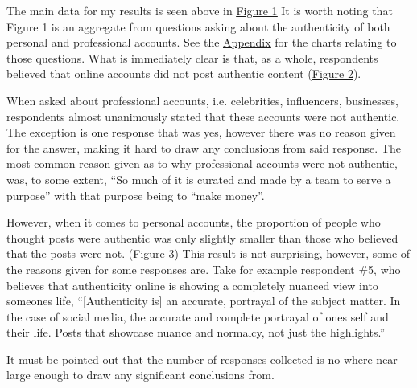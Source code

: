 \documentclass[12pt]{article}
\begin{document}
\begin{doublespace}
    \par The main data for my results is seen above in \underline{\hyperref[fig:pie1]{Figure 1}}
        It is worth noting that Figure 1 is an aggregate from questions asking about the authenticity of both personal and professional accounts. See the \underline{\hyperref[sec:appendix]{Appendix}} for the charts relating to those questions.
        What is immediately clear is that, as a whole, respondents believed that online accounts did not post authentic content (\underline{\hyperref[fig:chart2]{Figure 2}}).
    \par When asked about professional accounts, i.e. celebrities, influencers, businesses, respondents almost unanimously stated that these accounts were not authentic. 
        The exception is one response that was yes, however there was no reason given for the answer, making it hard to draw any conclusions from said response.
        The most common reason given as to why professional accounts were not authentic, was, to some extent, ``So much of it is curated and made by a team to serve a purpose'' with that purpose being to ``make money''.
    \par However, when it comes to personal accounts, the proportion of people who thought posts were authentic was only slightly smaller than those who believed that the posts were not. (\underline{\hyperref[fig:chart3]{Figure 3}})
        This result is not surprising, however, some of the reasons given for some responses are.
        Take for example respondent \#5, who believes that authenticity online is showing a completely nuanced view into someones life, ``[Authenticity is] an accurate, portrayal of the subject matter. In the case of social media, the accurate and complete portrayal of ones self and their life. Posts that showcase nuance and normalcy, not just the highlights.''
    \par It must be pointed out that the number of responses collected is no where near large enough to draw any significant conclusions from.


\end{doublespace}
\end{document}
